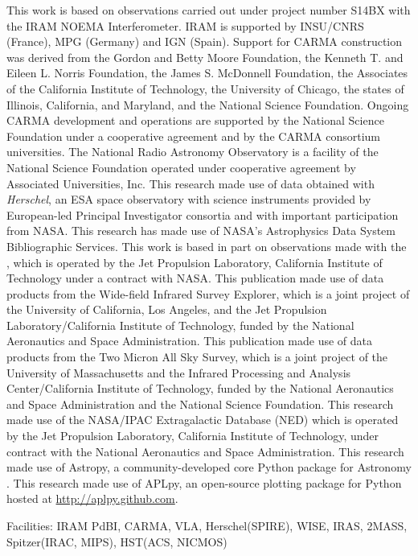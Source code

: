 \documentclass[]{emulateapj}
\begin{document}
\acknowledgments
This work is based on observations carried out under project number S14BX
with the IRAM NOEMA Interferometer. IRAM is supported by INSU/CNRS (France), MPG (Germany) and IGN (Spain).
Support for CARMA construction was derived from the Gordon and Betty Moore
Foundation, the Kenneth T. and Eileen L. Norris Foundation, the James S.
McDonnell Foundation, the Associates of the California Institute of
Technology, the University of Chicago, the states of Illinois, California, and
Maryland, and the National Science Foundation. Ongoing CARMA development and
operations are supported by the National Science Foundation under a
cooperative agreement and by the CARMA consortium universities.
The National Radio Astronomy Observatory is a facility of the National Science
Foundation operated under cooperative agreement by Associated
Universities, Inc.
This research made use of data obtained with {\it Herschel}, an ESA space
observatory with science instruments provided by European-led Principal
Investigator consortia and with important participation from NASA.
This research has made use of NASA's Astrophysics Data System Bibliographic
Services.
This work is based in part on observations made with the \spitzer,
which is operated by the Jet Propulsion Laboratory, California Institute of
Technology under a contract with NASA.
This publication made use of data products from the Wide-field Infrared
Survey Explorer, which is a joint project of the University of California, Los
Angeles, and the Jet Propulsion Laboratory/California Institute of Technology,
funded by the National Aeronautics and Space Administration.
This publication made use of data products from the Two Micron All Sky
Survey, which is a joint project of the University of Massachusetts and the
Infrared Processing and Analysis Center/California Institute of Technology,
funded by the National Aeronautics and Space Administration and the National
Science Foundation.
This research made use of the NASA/IPAC Extragalactic Database (NED) which
is operated by the Jet Propulsion Laboratory, California Institute of
Technology, under contract with the National Aeronautics and Space
Administration.
This research made use of Astropy, a community-developed core Python package for Astronomy \citep{astropy}.
This research made use of APLpy, an open-source plotting package for Python hosted at \url{http://aplpy.github.com}.

Facilities: IRAM PdBI, CARMA, VLA, Herschel(SPIRE), WISE, IRAS, 2MASS, Spitzer(IRAC, MIPS), HST(ACS, NICMOS)




\end{document}
